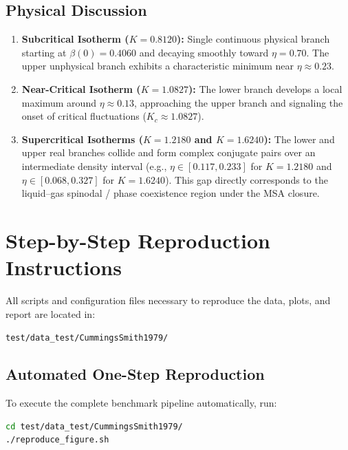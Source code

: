 \documentclass[11pt,a4paper]{article}
\begin{document}
\subsection{Physical Discussion}
\begin{enumerate}
    \item \textbf{Subcritical Isotherm ($K = 0.8120$):} Single continuous physical branch starting at $\beta(0) = 0.4060$ and decaying smoothly toward $\eta = 0.70$. The upper unphysical branch exhibits a characteristic minimum near $\eta \approx 0.23$.
    \item \textbf{Near-Critical Isotherm ($K = 1.0827$):} The lower branch develops a local maximum around $\eta \approx 0.13$, approaching the upper branch and signaling the onset of critical fluctuations ($K_c \approx 1.0827$).
    \item \textbf{Supercritical Isotherms ($K = 1.2180$ and $K = 1.6240$):} The lower and upper real branches collide and form complex conjugate pairs over an intermediate density interval (e.g., $\eta \in [0.117, 0.233]$ for $K = 1.2180$ and $\eta \in [0.068, 0.327]$ for $K = 1.6240$). This gap directly corresponds to the liquid--gas spinodal / phase coexistence region under the MSA closure.
\end{enumerate}

\section{Step-by-Step Reproduction Instructions}

All scripts and configuration files necessary to reproduce the data, plots, and report are located in:
\begin{center}
\texttt{test/data\_test/CummingsSmith1979/}
\end{center}

\subsection{Automated One-Step Reproduction}
To execute the complete benchmark pipeline automatically, run:
\begin{lstlisting}[language=bash]
cd test/data_test/CummingsSmith1979/
./reproduce_figure.sh
\end{lstlisting}
\end{document}
